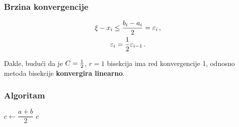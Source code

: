 \subsubsection{Brzina konvergencije}

\begin{gather*}
    \xi - x_i \leq \frac{b_i-a_i}{2} = \varepsilon_i\,,\\
    \varepsilon_i={1\over 2} \varepsilon_{i-1}\,.
\end{gather*}

Dakle, budući da je $C={1\over 2}$, $r=1$ bisekcija ima red konvergencije 1,
odnosno metoda bisekcije \textbf{konvergira linearno}.

\subsubsection{Algoritam}

\begin{algorithmic}
    \State $c \gets \dfrac{a + b}{2}$
        \State \Return $c$
    \EndIf
        \State \Return {}
    \Else
        \State \Return {}
    \EndIf
\EndFunction
\end{algorithmic}
